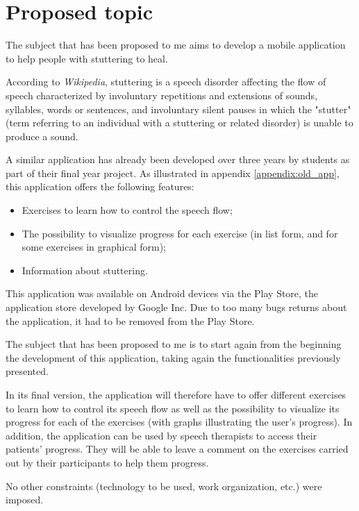 \section{Proposed topic}

The subject that has been proposed to me aims to develop a mobile application  to help people with stuttering to heal.

According to \textit{Wikipedia}\cite{def_wiki}, stuttering is a speech disorder affecting the flow of speech characterized by involuntary repetitions and extensions of sounds, syllables, words or sentences, and involuntary silent pauses in which the "stutter" (term referring to an individual with a stuttering or related disorder) is unable to produce a sound.

A similar application has already been developed over three years by students as part of their final year project. As illustrated in appendix \ref{appendix:old_app}, this application offers the following features:

\begin{itemize}
  \item Exercises to learn how to control the speech flow;
  \item The possibility to visualize progress for each exercise (in list form, and for some exercises in graphical form);
  \item Information about stuttering.
\end{itemize}

This application was available on Android devices via the Play Store, the application store developed by Google Inc. Due to too many bugs returns about the application, it had to be removed from the Play Store.

The subject that has been proposed to me is to start again from the beginning the development of this application, taking again the functionalities previously presented.

In its final version, the application will therefore have to offer different exercises to learn how to control its speech flow as well as the possibility to visualize its progress for each of the exercises (with graphs illustrating the user's progress). In addition, the application can be used by speech therapists to access their patients' progress. They will be able to leave a comment on the exercises carried out by their participants to help them progress.

No other constraints (technology to be used, work organization, etc.) were imposed.


